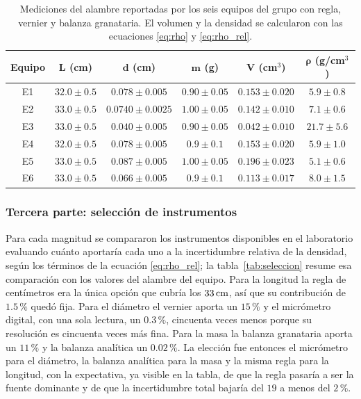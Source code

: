 \begin{table}[H]
    \centering
    \caption{Mediciones del alambre reportadas por los seis equipos del grupo con regla, vernier y balanza granataria. El volumen y la densidad se calcularon con las ecuaciones \eqref{eq:rho} y \eqref{eq:rho_rel}.}
    \label{tab:alambre_p1}
    \begin{tabular}{c c c c c c}
        \toprule
        \textbf{Equipo} & $\bm{L}$ (cm) & $\bm{d}$ (cm) & $\bm{m}$ (g) & $\bm{V}$ (cm$^{3}$) & $\bm{\rho}$ (g/cm$^{3}$) \\
        \midrule
        E1 & $32.0 \pm 0.5$ & $0.078 \pm 0.005$   & $0.90 \pm 0.05$ & $0.153 \pm 0.020$ & $5.9 \pm 0.8$ \\
        E2 & $33.0 \pm 0.5$ & $0.0740 \pm 0.0025$ & $1.00 \pm 0.05$ & $0.142 \pm 0.010$ & $7.1 \pm 0.6$ \\
        E3 & $33.0 \pm 0.5$ & $0.040 \pm 0.005$   & $0.90 \pm 0.05$ & $0.042 \pm 0.010$ & $21.7 \pm 5.6$ \\
        E4 & $32.0 \pm 0.5$ & $0.078 \pm 0.005$   & $0.9 \pm 0.1$   & $0.153 \pm 0.020$ & $5.9 \pm 1.0$ \\
        E5 & $33.0 \pm 0.5$ & $0.087 \pm 0.005$   & $1.00 \pm 0.05$ & $0.196 \pm 0.023$ & $5.1 \pm 0.6$ \\
        E6 & $33.0 \pm 0.5$ & $0.066 \pm 0.005$   & $0.9 \pm 0.1$   & $0.113 \pm 0.017$ & $8.0 \pm 1.5$ \\
        \bottomrule
    \end{tabular}
\end{table}

\subsubsection{Tercera parte: selección de instrumentos}

Para cada magnitud se compararon los instrumentos disponibles en el laboratorio evaluando cuánto aportaría cada uno a la incertidumbre relativa de la densidad, según los términos de la ecuación \eqref{eq:rho_rel}; la tabla~\ref{tab:seleccion} resume esa comparación con los valores del alambre del equipo. Para la longitud la regla de centímetros era la única opción que cubría los $33\,\mathrm{cm}$, así que su contribución de $1.5\,\%$ quedó fija. Para el diámetro el vernier aporta un $15\,\%$ y el micrómetro digital, con una sola lectura, un $0.3\,\%$, cincuenta veces menos porque su resolución es cincuenta veces más fina. Para la masa la balanza granataria aporta un $11\,\%$ y la balanza analítica un $0.02\,\%$. La elección fue entonces el micrómetro para el diámetro, la balanza analítica para la masa y la misma regla para la longitud, con la expectativa, ya visible en la tabla, de que la regla pasaría a ser la fuente dominante y de que la incertidumbre total bajaría del $19$ a menos del $2\,\%$.

